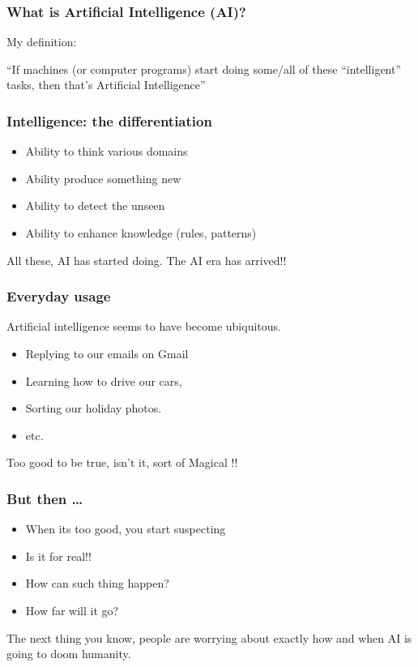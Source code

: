 \begin{frame}[fragile]\frametitle{ What is Artificial Intelligence (AI)?}
My definition:


``If machines (or computer programs) start doing some/all of these ``intelligent'' tasks, then that's Artificial Intelligence''

\end{frame}

\begin{frame}[fragile]\frametitle{ Intelligence: the differentiation}
\begin{itemize}
\item Ability to think various domains
\item Ability produce something new
\item Ability to detect the unseen
\item Ability to enhance knowledge (rules, patterns)
\end{itemize}
All these, AI has started doing. The AI era has arrived!!
\end{frame}



\begin{frame}[fragile]\frametitle{Everyday usage}
Artificial intelligence seems to have become ubiquitous.
\begin{itemize}
\item Replying to our emails on Gmail
\item Learning how to drive our cars,
\item Sorting our holiday photos.
\item etc.
\end{itemize}
Too good to be true, isn't it, sort of Magical !!
\end{frame}

\begin{frame}[fragile]\frametitle{But then \ldots}
\begin{itemize}
\item When its too good, you start suspecting
\item Is it for real!!
\item How can such thing happen?
\item How far will it go?
\end{itemize}
The next thing you know, people are worrying about exactly how and when AI is going to doom humanity.
\end{frame}


